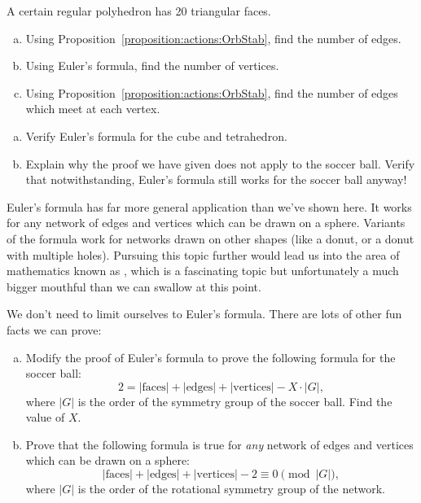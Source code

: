 \begin{exercise}\label{exercise:actions:Euler5}
A certain regular polyhedron has 20 triangular faces. 
\begin{enumerate}[(a)]
\item
Using Proposition~\ref{proposition:actions:OrbStab}, find the number of edges.
\item
Using Euler's formula, find the number of vertices.
\item
Using Proposition~\ref{proposition:actions:OrbStab}, find the number of edges which meet at each vertex.
\end{enumerate}
\end{exercise}

\begin{exercise}\label{exercise:actions:Euler 4}
\begin{enumerate}[(a)]
\item Verify Euler's formula for the cube and tetrahedron.
\item Explain why the proof we have given does not apply to the soccer ball. Verify that notwithstanding, Euler's formula still works for the soccer ball anyway! 
\end{enumerate}
\end{exercise}

\begin{rem}
 Euler's formula has far more general application than we've shown here. It works for any network of edges and vertices which can be drawn on a sphere. Variants of the formula work for networks drawn on other shapes (like a donut, or a donut with multiple holes).  Pursuing this topic further would lead us into the area  of mathematics known as , which is a fascinating topic but unfortunately a much bigger mouthful than we can swallow at this point. 
\end{rem}

We don't need to limit ourselves to Euler's formula.  There are lots of other fun facts we can prove:

\begin{exercise}\label{exercise:actions:Euler n}
\begin{enumerate}[(a)]
\item Modify the proof of Euler's formula to prove the following formula for the soccer ball:
\[2 =  |\text{faces}| + |\text{edges}| + |\text{vertices}| - X \cdot |G|,\]
where $|G|$ is the order of the symmetry group of the soccer ball.  Find the value of $X$.
\item 
Prove that the following formula is true for \emph{any} network of edges and vertices which can be drawn on a sphere:
\[ |\text{faces}| + |\text{edges}| + |\text{vertices}| -2 \equiv 0 \pmod{|G|},\]
where $|G|$ is the order of the rotational symmetry group of the network.
\end{enumerate}
\end{exercise}


